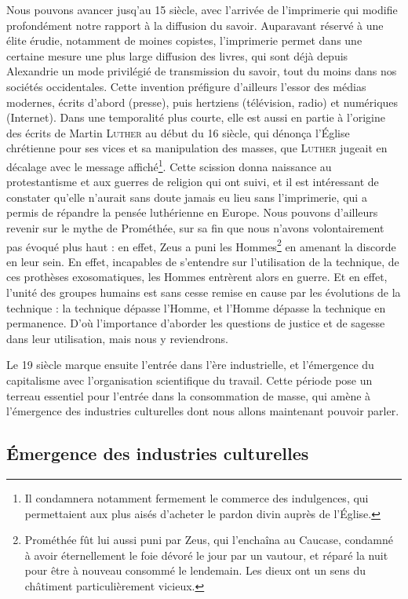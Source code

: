 \documentclass[a4paper,14pt]{extreport}
\begin{document}
Nous pouvons avancer jusq'au 15 siècle, avec l'arrivée de l'imprimerie qui modifie profondément notre rapport à la diffusion du savoir. Auparavant réservé à une élite érudie, notamment de moines copistes, l'imprimerie permet dans une certaine mesure une plus large diffusion des livres, qui sont déjà depuis Alexandrie un mode privilégié de transmission du savoir, tout du moins dans nos sociétés occidentales. Cette invention préfigure d'ailleurs l'essor des médias modernes, écrits d'abord (presse), puis hertziens (télévision, radio) et numériques (Internet). Dans une temporalité plus courte, elle est aussi en partie à l'origine des écrits de Martin \textsc{Luther} au début du 16 siècle, qui dénonça l'Église chrétienne pour ses vices et sa manipulation des masses, que \textsc{Luther} jugeait en décalage avec le message affiché\footnote{Il condamnera notamment fermement le commerce des indulgences, qui permettaient aux plus aisés d'acheter le pardon divin auprès de l'Église.}. Cette scission donna naissance au protestantisme et aux guerres de religion qui ont suivi, et il est intéressant de constater qu'elle n'aurait sans doute jamais eu lieu sans l'imprimerie, qui a permis de répandre la pensée luthérienne en Europe. Nous pouvons d'ailleurs revenir sur le mythe de Prométhée, sur sa fin que nous n'avons volontairement pas évoqué plus haut : en effet, Zeus a puni les Hommes\footnote{Prométhée fût lui aussi puni par Zeus, qui l'enchaîna au Caucase, condamné à avoir éternellement le foie dévoré le jour par un vautour, et réparé la nuit pour être à nouveau consommé le lendemain. Les dieux ont un sens du châtiment particulièrement vicieux.} en amenant la discorde en leur sein. En effet, incapables de s'entendre sur l'utilisation de la technique, de ces prothèses exosomatiques, les Hommes entrèrent alors en guerre. Et en effet, l'unité des groupes humains est sans cesse remise en cause par les évolutions de la technique : la technique dépasse l'Homme, et l'Homme dépasse la technique en permanence. D'où l'importance d'aborder les questions de justice et de sagesse dans leur utilisation, mais nous y reviendrons.

Le 19 siècle marque ensuite l'entrée dans l'ère industrielle, et l'émergence du capitalisme avec l'organisation scientifique du travail. Cette période pose un terreau essentiel pour l'entrée dans la consommation de masse, qui amène à l'émergence des industries culturelles dont nous allons maintenant pouvoir parler.

\subsection{Émergence des industries culturelles}
\end{document}
